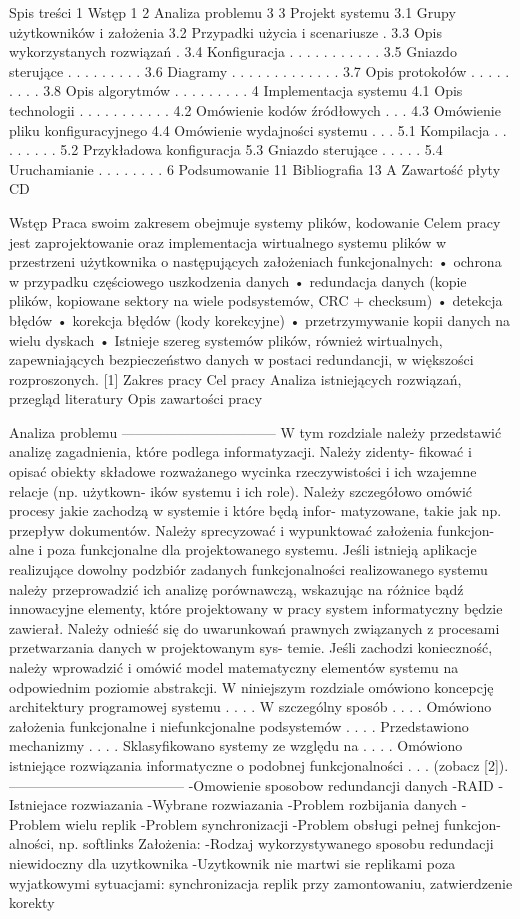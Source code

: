 Spis treści
1 Wstęp 1
2 Analiza problemu 3
3 Projekt systemu
3.1 Grupy użytkowników i założenia
3.2 Przypadki użycia i scenariusze .
3.3 Opis wykorzystanych rozwiązań .
3.4 Konfiguracja . . . . . . . . . . .
3.5 Gniazdo sterujące . . . . . . . . .
3.6 Diagramy . . . . . . . . . . . . .
3.7 Opis protokołów . . . . . . . . .
3.8 Opis algorytmów . . . . . . . . .
4 Implementacja systemu
4.1 Opis technologii . . . . . . . . . . .
4.2 Omówienie kodów źródłowych . . .
4.3 Omówienie pliku konfiguracyjnego
4.4 Omówienie wydajności systemu . . .
5.1 Kompilacja . . . . . . . .
5.2 Przykładowa konfiguracja
5.3 Gniazdo sterujące . . . . .
5.4 Uruchamianie . . . . . . . .
6 Podsumowanie 11
Bibliografia 13
A Zawartość płyty CD

Wstęp
Praca swoim zakresem obejmuje systemy plików, kodowanie
Celem pracy jest zaprojektowanie oraz implementacja wirtualnego systemu plików w przestrzeni użytkownika o następujących założeniach funkcjonalnych:
• ochrona w przypadku częściowego uszkodzenia danych
• redundacja danych (kopie plików, kopiowane sektory na wiele podsystemów, CRC + checksum)
• detekcja błędów
• korekcja błędów (kody korekcyjne)
• przetrzymywanie kopii danych na wielu dyskach
•
Istnieje szereg systemów plików, również wirtualnych, zapewniających bezpieczeństwo danych w postaci
redundancji, w większości rozproszonych. [1]
Zakres pracy
Cel pracy
Analiza istniejących rozwiązań, przegląd literatury
Opis zawartości pracy


Analiza problemu
---------------------------------
W tym rozdziale należy przedstawić analizę zagadnienia, które podlega informatyzacji. Należy zidenty-
fikować i opisać obiekty składowe rozważanego wycinka rzeczywistości i ich wzajemne relacje (np. użytkown-
ików systemu i ich role). Należy szczegółowo omówić procesy jakie zachodzą w systemie i które będą infor-
matyzowane, takie jak np. przepływ dokumentów. Należy sprecyzować i wypunktować założenia funkcjon-
alne i poza funkcjonalne dla projektowanego systemu. Jeśli istnieją aplikacje realizujące dowolny podzbiór
zadanych funkcjonalności realizowanego systemu należy przeprowadzić ich analizę porównawczą, wskazując na
różnice bądź innowacyjne elementy, które projektowany w pracy system informatyczny będzie zawierał. Należy
odnieść się do uwarunkowań prawnych związanych z procesami przetwarzania danych w projektowanym sys-
temie. Jeśli zachodzi konieczność, należy wprowadzić i omówić model matematyczny elementów systemu na
odpowiednim poziomie abstrakcji.
W niniejszym rozdziale omówiono koncepcję architektury programowej systemu . . . . W szczególny sposób
. . . . Omówiono założenia funkcjonalne i niefunkcjonalne podsystemów . . . . Przedstawiono mechanizmy . . . .
Sklasyfikowano systemy ze względu na . . . . Omówiono istniejące rozwiązania informatyczne o podobnej
funkcjonalności . . . (zobacz [2]).
--------------------------------------
-Omowienie sposobow redundancji danych -RAID -Istniejace rozwiazania -Wybrane rozwiazania
-Problem rozbijania danych -Problem wielu replik -Problem synchronizacji -Problem obsługi pełnej funkcjon-
alności, np. softlinks
Założenia: -Rodzaj wykorzystywanego sposobu redundacji niewidoczny dla uzytkownika -Uzytkownik nie
martwi sie replikami poza wyjatkowymi sytuacjami: synchronizacja replik przy zamontowaniu, zatwierdzenie
korekty

